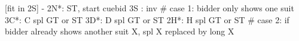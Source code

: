 [fit in 2S] - 
2N*: ST, start cuebid
3S : inv
# case 1: bidder only shows one suit
3C*: C spl GT or ST
3D*: D spl GT or ST
2H*: H spl GT or ST
# case 2: if bidder already shows another suit X, spl X replaced by long X
